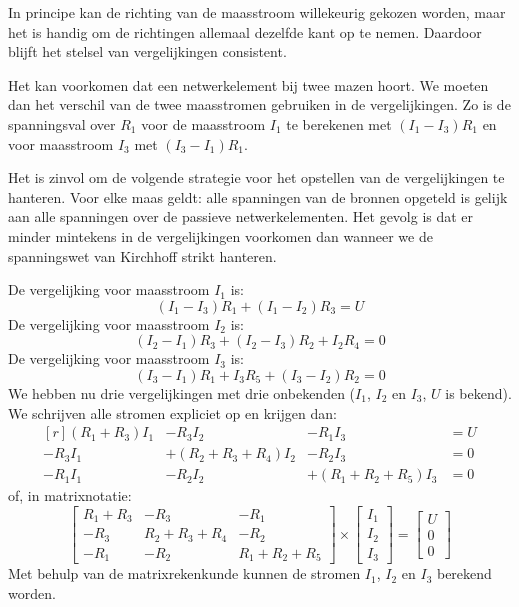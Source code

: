 In principe kan de richting van de maasstroom willekeurig gekozen worden, maar het is handig om de richtingen allemaal dezelfde kant op te nemen. Daardoor blijft het stelsel van vergelijkingen consistent.

Het kan voorkomen dat een netwerkelement bij twee mazen hoort. We moeten dan het verschil van de twee maasstromen gebruiken in de vergelijkingen. Zo is de spanningsval over $R_1$ voor de maasstroom $I_1$ te berekenen met $(I_1-I_3)R_1$ en voor maasstroom $I_3$ met $(I_3-I_1)R_1$.

Het is zinvol om de volgende strategie voor het opstellen van de vergelijkingen te hanteren. Voor elke maas geldt: alle spanningen van de bronnen opgeteld is gelijk aan alle spanningen over de passieve netwerkelementen. Het gevolg is dat er minder mintekens in de vergelijkingen voorkomen dan wanneer we de spanningswet van Kirchhoff strikt hanteren.

De vergelijking voor maasstroom $I_1$ is:
%
\begin{equation}
(I_1 - I_3)R_1 + (I_1-I_2)R_3 = U
\end{equation}
%
De vergelijking voor maasstroom $I_2$ is:
%
\begin{equation}
(I_2-I_1)R_3 + (I_2-I_3)R_2 + I_2R_4=0
\end{equation}
%
De vergelijking voor maasstroom $I_3$ is:
%
\begin{equation}
(I_3-I_1)R_1 + I_3R_5 + (I_3-I_2)R_2 = 0
\end{equation}
%
We hebben nu drie vergelijkingen met drie onbekenden ($I_1$, $I_2$ en $I_3$, $U$ is bekend). We schrijven alle stromen expliciet op en krijgen dan:
%
\begin{equation}
\begin{matrix*}[r]
(R_1+R_3)I_1 & -R_3I_2 & -R_1I_3 &= U \\
-R_3I_1 & +(R_2+R_3+R_4)I_2 & -R_2I_3 &= 0\\
-R_1I_1 & -R_2I_2 & +(R_1+R_2+R_5)I_3 &=0
\end{matrix*}
\end{equation}
%
of, in matrixnotatie:
%
\begin{equation}
\begin{bmatrix}
R_1+R_3 & -R_3 & -R_1 \\
-R_3 & R_2+R_3+R_4 & -R_2 \\
-R_1 & -R_2 & R_1+R_2+R_5
\end{bmatrix} \times 
\begin{bmatrix}
I_1 \\ I_2 \\ I_3
\end{bmatrix} =
\begin{bmatrix}
U \\ 0 \\ 0
\end{bmatrix}
\end{equation}
%
Met behulp van de matrixrekenkunde kunnen de stromen $I_1$, $I_2$ en $I_3$ berekend worden.


